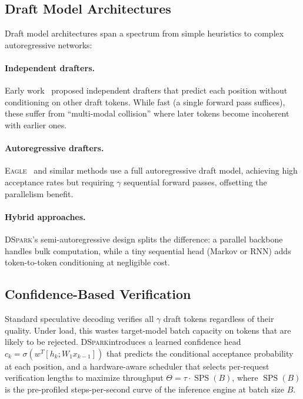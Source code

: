 \documentclass[11pt,a4paper]{article}
\newcommand{\DSpark}{\textsc{DSpark}}
\newcommand{\Eagle}{\textsc{Eagle}}
\DeclareMathOperator{\SPS}{SPS}
\begin{document}
\subsection{Draft Model Architectures}
Draft model architectures span a spectrum from simple heuristics to complex
autoregressive networks:

\paragraph{Independent drafters.}
Early work~\cite{stern2018blockwise} proposed independent drafters that
predict each position without conditioning on other draft tokens. While
fast (a single forward pass suffices), these suffer from ``multi-modal
collision'' where later tokens become incoherent with earlier ones.

\paragraph{Autoregressive drafters.}
\Eagle~\cite{miao2025eagle3} and similar methods use a full autoregressive
draft model, achieving high acceptance rates but requiring $\gamma$
sequential forward passes, offsetting the parallelism benefit.

\paragraph{Hybrid approaches.}
\DSpark's semi-autoregressive design splits the difference: a parallel
backbone handles bulk computation, while a tiny sequential head (Markov or
RNN) adds token-to-token conditioning at negligible cost.

\subsection{Confidence-Based Verification}
Standard speculative decoding verifies all $\gamma$ draft tokens regardless
of their quality. Under load, this wastes target-model batch capacity on
tokens that are likely to be rejected. \DSpark introduces a learned
confidence head $c_k = \sigma(w^T [h_k; W_1 x_{k-1}])$ that predicts the
conditional acceptance probability at each position, and a hardware-aware
scheduler that selects per-request verification lengths to maximize
throughput $\Theta = \tau \cdot \SPS(B)$, where $\SPS(B)$ is the
pre-profiled steps-per-second curve of the inference engine at batch size
$B$.
\end{document}
